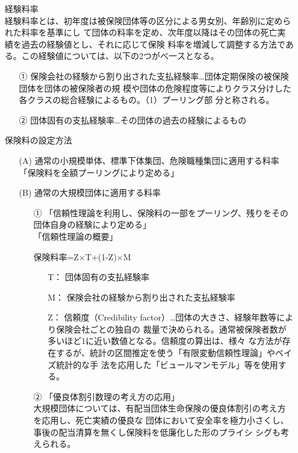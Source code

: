\documentclass[report,gutter=10mm,fore-edge=10mm,uplatex,dvipdfmx]{jlreq}
\begin{document}
\begin{itemize}
\item[] 経験料率\\
 経験料率とは、初年度は被保険団体等の区分による男女別、年齢別に定められた料率を基準にし
 て団体の料率を定め、次年度以降はその団体の死亡実績を過去の経験値とし、それに応じて保険
 料率を増減して調整する方法である。この経験値については、以下の2つがべ一スとなる。
\begin{itemize}
\item[①] 保険会社の経験から割り出された支払経験率…団体定期保険の被保険団体を団体の被保険者の規
 模や団体の危険程度等によりクラス分けした各クラスの総合経験によるもの。（1）プーリング部
 分と称される。
\item[②] 団体固有の支払経験率…その団体の過去の経験によるもの
\end{itemize}
\item[] 保険料の設定方法
\begin{itemize}
\item[(A)] 通常の小規模単体、標準下体集団、危険職種集団に適用する料率\\
 「保険料を全額プーリングにより定める」
\item[(B)] 通常の大規模団体に適用する料率
\begin{itemize}
\item[ ① ] 「信頼性理論を利用し、保険料の一部をプーリング、残りをその団体自身の経験により定める」\\
 「信頼性理論の概要」\par
 保険料率=Z×T+(1-Z)×M\\
\begin{itemize}
\item[  T： ] 団体固有の支払経験率
\item[ M： ]   保険会社の経験から割り出された支払経験率
\item[ Z： ]   信頼度（Credibility factor）…団体の大きさ、経験年数等により保険会社ごとの独自の
 裁量で決められる。通常被保険者数が多いほど1に近い数値となる。信頼度の算出は、様々
 な方法が存在するが、統計の区間推定を使う「有限変動信頼性理論」やベイズ統計的な手
 法を応用した「ビュールマンモデル」等を使用する。
\end{itemize}
\item[ ② ]「優良体割引数理の考え方の応用」\\
 大規模団体については、有配当団体生命保険の優良体割引の考え方を応用し、死亡実績の優良な
 団体において安全率を極力小さくし、事後の配当清算を無くし保険料を低廉化した形のプライシ
 シグも考えられる。
\end{itemize}

\end{itemize}
\end{itemize}
\end{document}
